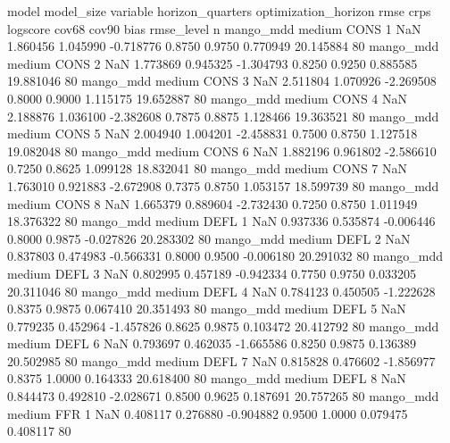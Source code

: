             model model_size variable  horizon_quarters optimization_horizon      rmse     crps  logscore  cov68  cov90      bias  rmse_level  n
        mango_mdd     medium     CONS                 1                  NaN  1.860456 1.045990 -0.718776 0.8750 0.9750  0.770949   20.145884 80
        mango_mdd     medium     CONS                 2                  NaN  1.773869 0.945325 -1.304793 0.8250 0.9250  0.885585   19.881046 80
        mango_mdd     medium     CONS                 3                  NaN  2.511804 1.070926 -2.269508 0.8000 0.9000  1.115175   19.652887 80
        mango_mdd     medium     CONS                 4                  NaN  2.188876 1.036100 -2.382608 0.7875 0.8875  1.128466   19.363521 80
        mango_mdd     medium     CONS                 5                  NaN  2.004940 1.004201 -2.458831 0.7500 0.8750  1.127518   19.082048 80
        mango_mdd     medium     CONS                 6                  NaN  1.882196 0.961802 -2.586610 0.7250 0.8625  1.099128   18.832041 80
        mango_mdd     medium     CONS                 7                  NaN  1.763010 0.921883 -2.672908 0.7375 0.8750  1.053157   18.599739 80
        mango_mdd     medium     CONS                 8                  NaN  1.665379 0.889604 -2.732430 0.7250 0.8750  1.011949   18.376322 80
        mango_mdd     medium     DEFL                 1                  NaN  0.937336 0.535874 -0.006446 0.8000 0.9875 -0.027826   20.283302 80
        mango_mdd     medium     DEFL                 2                  NaN  0.837803 0.474983 -0.566331 0.8000 0.9500 -0.006180   20.291032 80
        mango_mdd     medium     DEFL                 3                  NaN  0.802995 0.457189 -0.942334 0.7750 0.9750  0.033205   20.311046 80
        mango_mdd     medium     DEFL                 4                  NaN  0.784123 0.450505 -1.222628 0.8375 0.9875  0.067410   20.351493 80
        mango_mdd     medium     DEFL                 5                  NaN  0.779235 0.452964 -1.457826 0.8625 0.9875  0.103472   20.412792 80
        mango_mdd     medium     DEFL                 6                  NaN  0.793697 0.462035 -1.665586 0.8250 0.9875  0.136389   20.502985 80
        mango_mdd     medium     DEFL                 7                  NaN  0.815828 0.476602 -1.856977 0.8375 1.0000  0.164333   20.618400 80
        mango_mdd     medium     DEFL                 8                  NaN  0.844473 0.492810 -2.028671 0.8500 0.9625  0.187691   20.757265 80
        mango_mdd     medium      FFR                 1                  NaN  0.408117 0.276880 -0.904882 0.9500 1.0000  0.079475    0.408117 80
